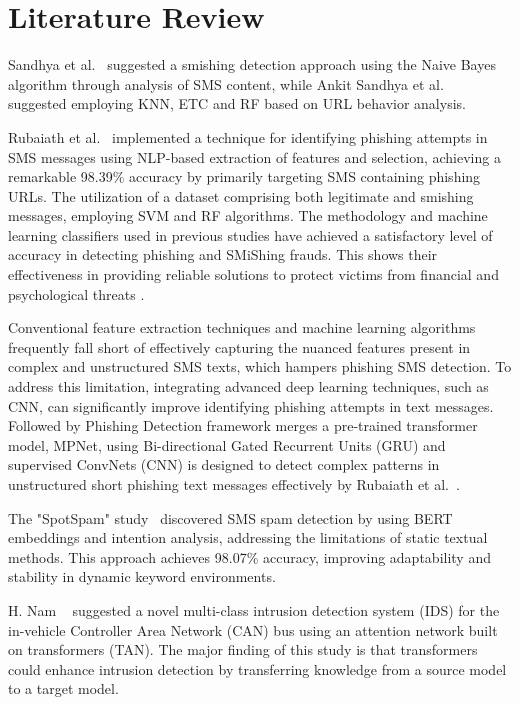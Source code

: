\section{Literature Review}
Sandhya et al.~\cite{mishra_2020_smishing} suggested a smishing detection approach using the Naive Bayes algorithm through analysis of SMS content, while Ankit Sandhya et al.~\cite{jain_2022_a} suggested employing KNN, ETC and RF based on URL behavior analysis. 

Rubaiath et al.~\cite{rubaiatheulfath_2021_detecting} implemented a technique for identifying phishing attempts in SMS messages using NLP-based extraction of features and selection, achieving a remarkable 98.39\% accuracy by primarily targeting SMS containing phishing URLs. The utilization of a dataset comprising both legitimate and smishing messages, employing SVM and RF algorithms. The methodology and machine learning classifiers used in previous studies \cite{balim_2019_automatic, mdfarhanshahriyar_2024_phishing} have achieved a satisfactory level of accuracy in detecting phishing and SMiShing frauds. This shows their effectiveness in providing reliable solutions to protect victims from financial and psychological threats \cite{boukari_2021_machine}.

Conventional feature extraction techniques and machine learning algorithms frequently fall short of effectively capturing the nuanced features present in complex and unstructured SMS texts, which hampers phishing SMS detection. To address this limitation, integrating advanced deep learning techniques, such as CNN\cite{ramilyarullin_2021_bert,nizojamanshohan_2024_enhancing}, can significantly improve identifying phishing attempts in text messages. Followed by Phishing Detection framework merges a pre-trained transformer model, MPNet, using Bi-directional Gated Recurrent Units (GRU) and supervised ConvNets (CNN) is designed to detect complex patterns in unstructured short phishing text messages effectively by Rubaiath et al.~\cite{rubaiatheulfath_2021_hybrid}.

The "SpotSpam" study~\cite{oswald_2022_spotspam} discovered SMS spam detection by using BERT embeddings and intention analysis, addressing the limitations of static textual methods. This approach achieves 98.07\% accuracy, improving adaptability and stability in dynamic keyword environments.

H. Nam ~\cite{nguyen_2023_transformerbased} suggested a novel multi-class intrusion detection system (IDS) for the in-vehicle Controller Area Network (CAN) bus using an attention network built on transformers (TAN). The major finding of this study is that transformers could enhance intrusion detection by transferring knowledge from a source model to a target model.

